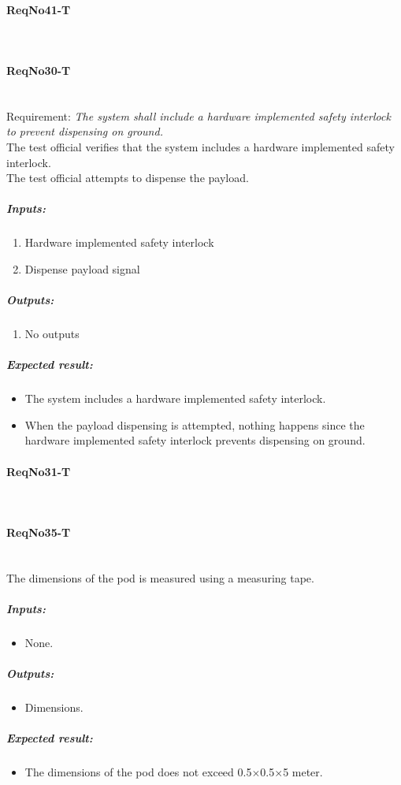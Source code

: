 \paragraph{ReqNo41-T}\mbox{}\\ %

\paragraph{ReqNo30-T}\mbox{}\\ %
Requirement: \textit{The system shall include a hardware implemented safety interlock to prevent dispensing on ground.}\\

The test official verifies that the system includes a hardware implemented safety interlock. \\
The test official attempts to dispense the payload.  
\subparagraph{Inputs:}
	\begin{enumerate}
	\item Hardware implemented safety interlock
	\item Dispense payload signal
	\end{enumerate}
\subparagraph{Outputs:}
	\begin{enumerate}
	\item No outputs
	\end{enumerate}
\subparagraph{Expected result:}
	\begin{itemize}
	\item The system includes a hardware implemented safety interlock.
	\item When the payload dispensing is attempted, nothing happens since the hardware implemented safety interlock prevents dispensing on ground.
	\end{itemize}

\paragraph{ReqNo31-T}\mbox{}\\ %

\paragraph{ReqNo35-T}\mbox{}\\ %
The dimensions of the pod is measured using a measuring tape.

	\subparagraph{Inputs:}
	\begin{itemize}
	\item None.
	\end{itemize}
	\subparagraph{Outputs:}
	\begin{itemize}
	\item Dimensions.
	\end{itemize}
	\subparagraph{Expected result:}
	\begin{itemize}
	\item The dimensions of the pod does not exceed 0.5$\times$0.5$\times$5 meter.
	\end{itemize}


